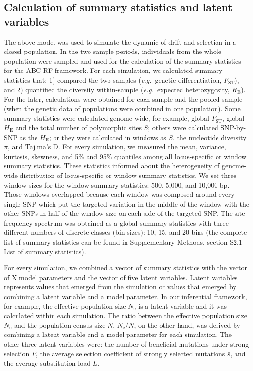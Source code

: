 \documentclass[a4paper, 12pt]{article}
\begin{document}
\subsection*{Calculation of summary statistics and latent variables}

The above model was used to simulate the dynamic of drift and selection in a closed population. In the two sample periods, individuals from the whole population were sampled and used for the calculation of the summary statistics for the ABC-RF framework. For each simulation, we calculated summary statistics that: 1) compared the two samples (\textit{e.g.}~genetic differentiation, $F_{\mathrm{ST}}$), and 2) quantified the diversity within-sample (\textit{e.g.}~expected heterozygosity, $H_{\mathrm{E}}$). For the later, calculations were obtained for each sample and the pooled sample (when the genetic data of populations were combined in one population). Some summary statistics were calculated genome-wide, for example, global $F_{\mathrm{ST}}$, global $H_{\mathrm{E}}$ and the total number of polymorphic sites $S$; others were calculated SNP-by-SNP as the $H_{\mathrm{E}}$; or they were calculated in windows as $S$, the nucleotide diversity $\pi$, and Tajima's D. For every simulation, we measured the mean, variance, kurtosis, skewness, and 5\% and 95\% quantiles among all locus-specific or window summary statistics. These statistics informed about the heterogeneity of genome-wide distribution of locus-specific or window summary statistics. We set three window sizes for the window summary statistics: 500, 5,000, and 10,000 bp. Those windows overlapped because each window was composed around every single SNP which put the targeted variation in the middle of the window with the other SNPs in half of the window size on each side of the targeted SNP. The site-frequency spectrum was obtained as a global summary statistics with three different numbers of discrete classes (bin sizes): 10, 15, and 20 bins (the complete list of summary statistics can be found in Supplementary Methods, section S2.1 List of summary statistics).

For every simulation, we combined a vector of summary statistics with the vector of X model parameters and the vector of five latent variables. Latent variables represents values that emerged from the simulation or values that emerged by combining a latent variable and a model parameter. In our inferential framework, for example, the effective population size $N_{\mathrm{e}}$ is a latent variable and it was calculated within each simulation. The ratio between the effective population size $N_{\mathrm{e}}$ and the population census size $N$, $N_{\mathrm{e}}/N$, on the other hand, was derived by combining a latent variable and a model parameter for each simulation. The other three latent variables were: the number of beneficial mutations under strong selection $P$, the average selection coefficient of strongly selected mutations $\bar{s}$, and the average substitution load $L$.
\end{document}
